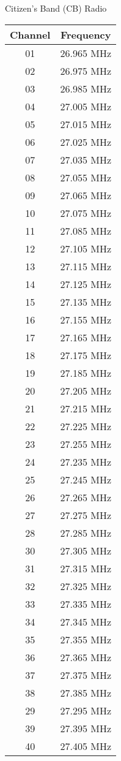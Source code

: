 
{ \scriptsize
\centering

Citizen's Band (CB) Radio\\
\begin{tabular}{|c|c|}\hline
Channel     & Frequency \\ \hline
01 & 26.965 MHz        \\
02 & 26.975 MHz        \\
03 & 26.985 MHz        \\
04 & 27.005 MHz        \\
05 & 27.015 MHz        \\
06 & 27.025 MHz        \\
07 & 27.035 MHz        \\
08 & 27.055 MHz        \\
09 & 27.065 MHz        \\
10 & 27.075 MHz        \\
11 & 27.085 MHz        \\
12 & 27.105 MHz        \\
13 & 27.115 MHz        \\
14 & 27.125 MHz        \\
15 & 27.135 MHz        \\
16 & 27.155 MHz        \\
17 & 27.165 MHz        \\
18 & 27.175 MHz        \\
19 & 27.185 MHz        \\
20 & 27.205 MHz        \\
21 & 27.215 MHz        \\
22 & 27.225 MHz        \\
23 & 27.255 MHz        \\
24 & 27.235 MHz        \\
25 & 27.245 MHz        \\
26 & 27.265 MHz        \\
27 & 27.275 MHz        \\
28 & 27.285 MHz        \\
30 & 27.305 MHz        \\
31 & 27.315 MHz        \\
32 & 27.325 MHz        \\
33 & 27.335 MHz        \\
34 & 27.345 MHz        \\
35 & 27.355 MHz        \\
36 & 27.365 MHz        \\
37 & 27.375 MHz        \\
38 & 27.385 MHz        \\
29 & 27.295 MHz        \\
39 & 27.395 MHz        \\
40 & 27.405 MHz        \\

\hline
\end{tabular}\\

\vspace{0.05in}

}
